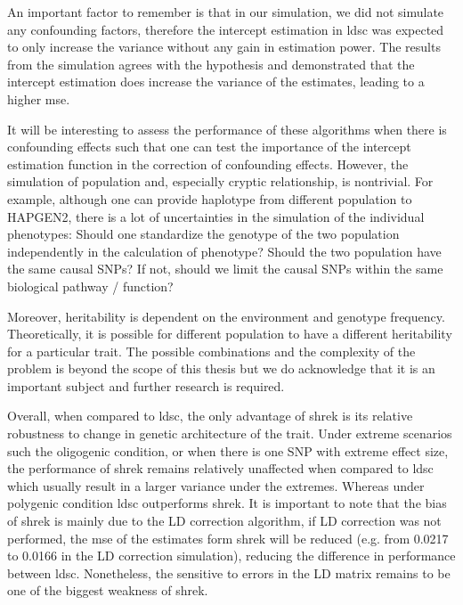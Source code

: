 \documentclass[12pt]{scrbook}
\begin{document}
An important factor to remember is that in our simulation, we did not simulate any confounding factors, therefore the intercept estimation in \gls{ldsc} was expected to only increase the variance without any gain in estimation power. 
The results from the simulation agrees with the hypothesis and demonstrated that the intercept estimation does increase the variance of the estimates, leading to a higher \gls{mse}. 

It will be interesting to assess the performance of these algorithms when there is confounding effects such that one can test the importance of the intercept estimation function in the correction of confounding effects.
However, the simulation of population and, especially cryptic relationship, is nontrivial.
For example, although one can provide haplotype from different population to HAPGEN2, there is a lot of uncertainties in the simulation of the individual phenotypes: 
Should one standardize the genotype of the two population independently in the calculation of phenotype? 
Should the two population have the same causal \glspl{SNP}?
If not, should we limit the causal \glspl{SNP} within the same biological pathway / function?

Moreover, heritability is dependent on the environment and genotype frequency. 
Theoretically, it is possible for different population to have a different heritability for a particular trait.
The possible combinations and the complexity of the problem is beyond the scope of this thesis but we do acknowledge that it is an important subject and further research is required.

Overall, when compared to \gls{ldsc}, the only advantage of \gls{shrek} is its relative robustness to change in genetic architecture of the trait.
Under extreme scenarios such the oligogenic condition, or when there is one \gls{SNP} with extreme effect size, the performance of \gls{shrek} remains relatively unaffected when compared to \gls{ldsc} which usually result in a larger variance under the extremes. 
Whereas under polygenic condition \gls{ldsc} outperforms \gls{shrek}.
It is important to note that the bias of \gls{shrek} is mainly due to the \gls{LD} correction algorithm, if \gls{LD} correction was not performed, the \gls{mse} of the estimates form \gls{shrek} will be reduced (e.g. from 0.0217 to 0.0166 in the \gls{LD} correction simulation), reducing the difference in performance between \gls{ldsc}.
Nonetheless, the sensitive to errors in the \gls{LD} matrix remains to be one of the biggest weakness of \gls{shrek}.
\end{document}
